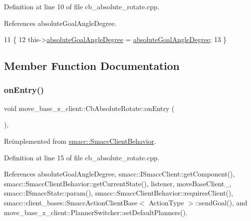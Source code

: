 Definition at line 10 of file cb\+\_\+absolute\+\_\+rotate.\+cpp.



References absolute\+Goal\+Angle\+Degree.


\begin{DoxyCode}
11 \{
12     this->\hyperlink{classmove__base__z__client_1_1CbAbsoluteRotate_a3732ce20b520f9df9408f849ff809a19}{absoluteGoalAngleDegree} = 
      \hyperlink{classmove__base__z__client_1_1CbAbsoluteRotate_a3732ce20b520f9df9408f849ff809a19}{absoluteGoalAngleDegree};
13 \}
\end{DoxyCode}


\subsection{Member Function Documentation}
\mbox{\label{classmove__base__z__client_1_1CbAbsoluteRotate_ab5537a52d9ddb242be60e6f9e0b231af}} 
\subsubsection{\texorpdfstring{on\+Entry()}{onEntry()}}
{\footnotesize\ttfamily void move\+\_\+base\+\_\+z\+\_\+client\+::\+Cb\+Absolute\+Rotate\+::on\+Entry (\begin{DoxyParamCaption}{ }\end{DoxyParamCaption})\hspace{0.3cm}{\ttfamily [override]}, {\ttfamily [virtual]}}



Reimplemented from \hyperlink{classsmacc_1_1SmaccClientBehavior_a7962382f93987c720ad432fef55b123f}{smacc\+::\+Smacc\+Client\+Behavior}.



Definition at line 15 of file cb\+\_\+absolute\+\_\+rotate.\+cpp.



References absolute\+Goal\+Angle\+Degree, smacc\+::\+I\+Smacc\+Client\+::get\+Component(), smacc\+::\+Smacc\+Client\+Behavior\+::get\+Current\+State(), listener, move\+Base\+Client\+\_\+, smacc\+::\+I\+Smacc\+State\+::param(), smacc\+::\+Smacc\+Client\+Behavior\+::requires\+Client(), smacc\+::client\+\_\+bases\+::\+Smacc\+Action\+Client\+Base$<$ Action\+Type $>$\+::send\+Goal(), and move\+\_\+base\+\_\+z\+\_\+client\+::\+Planner\+Switcher\+::set\+Default\+Planners().


